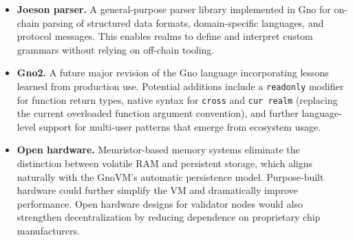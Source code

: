 \documentclass[12pt,a4paper]{article}
\newcommand{\passthrough}[1]{#1}
\begin{document}
\begin{itemize}
  transactions. This could unlock significant throughput improvements
  without sacrificing the determinism guarantee.
\item
  \textbf{Joeson parser.} A general-purpose parser library implemented
  in Gno for on-chain parsing of structured data formats,
  domain-specific languages, and protocol messages. This enables realms
  to define and interpret custom grammars without relying on off-chain
  tooling.
\item
  \textbf{Gno2.} A future major revision of the Gno language
  incorporating lessons learned from production use. Potential additions
  include a \passthrough{\lstinline!readonly!} modifier for function
  return types, native syntax for \passthrough{\lstinline!cross!} and
  \passthrough{\lstinline!cur realm!} (replacing the current overloaded
  function argument convention), and further language-level support for
  multi-user patterns that emerge from ecosystem usage.
\item
  \textbf{Open hardware.} Memristor-based memory systems eliminate the
  distinction between volatile RAM and persistent storage, which aligns
  naturally with the GnoVM's automatic persistence model. Purpose-built
  hardware could further simplify the VM and dramatically improve
  performance. Open hardware designs for validator nodes would also
  strengthen decentralization by reducing dependence on proprietary chip
  manufacturers.
\end{itemize}
\end{document}
